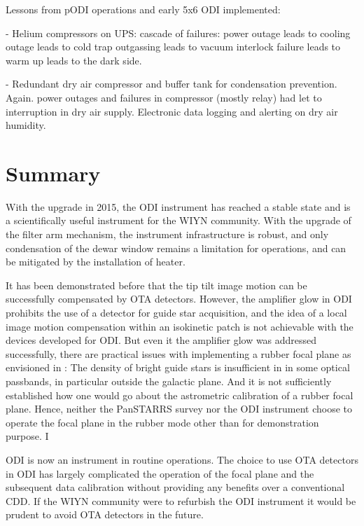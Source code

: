 \documentclass[draft]{spieman}
\begin{document}
Lessons from pODI operations and early 5x6 ODI implemented:

- Helium compressors on UPS: cascade of failures: power outage leads to cooling outage leads to 
cold trap outgassing leads to vacuum interlock failure leads to warm up leads to the dark side. 

- Redundant dry air compressor and buffer tank for condensation prevention. Again. power outages 
and failures in compressor (mostly relay) had let to interruption in dry air supply.  Electronic 
data logging and alerting on dry air humidity.




\section{Summary}

With the upgrade in 2015, the ODI instrument has reached a stable state and is a scientifically useful 
instrument for the WIYN community. With the upgrade of the filter arm mechanism, the instrument 
infrastructure is robust, and only condensation of the dewar window remains a limitation for 
operations, and can be mitigated by the installation of  heater.  

It has been demonstrated before that the tip tilt image motion can be successfully compensated by 
OTA detectors.  However, the amplifier glow in ODI prohibits the use of a detector for guide star 
acquisition, and the idea of a local image motion compensation within an isokinetic patch is not 
achievable with the devices developed for ODI. But even it the amplifier glow was addressed 
successfully, 
there are practical issues with implementing a rubber focal plane as envisioned in \cite{tonry2002}: The 
density of  bright guide stars is insufficient in in some  optical passbands, in particular outside the 
galactic plane. And it is not sufficiently established how one would go about the astrometric calibration 
of a rubber focal plane.  Hence, neither the PanSTARRS survey nor the ODI instrument choose to 
operate the focal plane in the rubber mode other than for demonstration purpose.  I

ODI is now an instrument in routine operations. The choice to use  OTA detectors in ODI has largely 
complicated the operation of the focal plane and the subsequent data calibration without providing any 
benefits over a conventional CDD. If the WIYN community were to refurbish the ODI instrument it would 
be prudent to avoid OTA detectors in the future. 
 
 

\end{document}
